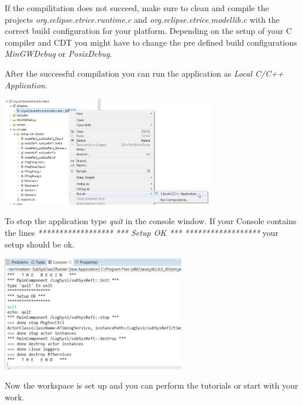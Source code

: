 If the compilitation does not succeed, make sure to clean and compile the projects \emph{org.eclipse.etrice.runtime.c} and \emph{org.eclipse.etrice.modellib.c} with the correct build configuration for your platform. Depending on the setup of your C compiler and CDT you might have to change the pre defined build configurations \emph{MinGWDebug} or \emph{PosixDebug}.

After the successful compilation you can run the application as \emph{Local C/C++ Application}.

\includegraphics[width=0.7\textwidth]{images/014-08-RunAsC-CPP-Application.png}

\newpage
To stop the application type \emph{quit} in the console window. If your Console contains the lines
\newline\emph{******************}
\newline\emph{*** Setup OK ***}
\newline\emph{******************} 
\newline your setup should be ok.

\includegraphics[width=0.6\textwidth]{images/013-SetupWorkspace07.png} 

Now the workspace is set up and you can perform the tutorials or start with your work.

